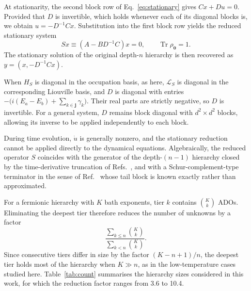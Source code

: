 \documentclass[11pt,a4paper]{article}
\newcommand{\Lc}{\mathcal{L}}
\newcommand{\tr}{\operatorname{Tr}}
\begin{document}
At stationarity, the second block row of Eq.~\eqref{eq:stationary} gives
$Cx + Du = 0$. Provided that $D$ is invertible, which holds whenever each of its
diagonal blocks is, we obtain $u = -D^{-1}Cx$. Substitution into the first block
row yields the reduced stationary system
\begin{equation}
S x \equiv \left(A - B D^{-1} C\right) x = 0, \qquad \tr \rho_{\mathbf{0}} = 1 .
\label{eq:schur}
\end{equation}
The stationary solution of the original depth-$n$ hierarchy is then recovered
as $y = (x, -D^{-1}Cx)$.

When $H_S$ is diagonal in the occupation basis, as here, $\Lc_S$ is diagonal in
the corresponding Liouville basis, and $D$ is diagonal with entries
$-\big(i(E_a - E_b) + \sum_{k\in\mathbf{j}}\gamma_k\big)$. Their real parts are
strictly negative, so $D$ is invertible. For a general
system, $D$ remains block diagonal with $d^2\times d^2$ blocks, allowing its
inverse to be applied independently to each block.

During time evolution, $\dot u$ is generally nonzero, and the stationary
reduction cannot be applied directly to the dynamical equations. Algebraically, the reduced
operator $S$ coincides with the generator of the depth-$(n-1)$ hierarchy closed
by the time-derivative truncation of Refs.~\cite{Hou2015,KasparThoss2021},
and with a Schur-complement-type terminator in the sense of
Ref.~\cite{Vadimov2026} whose tail block is known exactly rather than
approximated.

For a fermionic hierarchy with $K$ bath exponents, tier $k$ contains
$\binom{K}{k}$ ADOs. Eliminating the deepest tier therefore reduces the number
of unknowns by a factor
\begin{equation}
\frac{\sum_{k\le n}\binom{K}{k}}{\sum_{k<n}\binom{K}{k}} .
\end{equation}
Since consecutive tiers differ in size by the factor $(K-n+1)/n$, the deepest
tier holds most of the hierarchy when $K \gg n$, as in the low-temperature cases
studied here. Table~\ref{tab:count} summarises the hierarchy sizes considered
in this work, for which the reduction factor ranges from 3.6 to 10.4.
\end{document}
